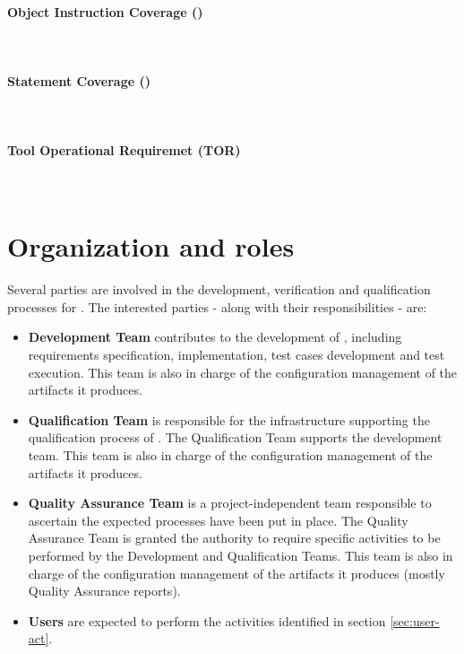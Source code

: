 \paragraph*{Object Instruction Coverage (\oic)} \ \\

\paragraph*{Statement Coverage (\stc)} \ \\

\paragraph*{Tool Operational Requiremet (TOR)} \ \\

\section{Organization and roles}
Several parties are involved in the development, verification and qualification processes for \xcov. The interested parties - along with their responsibilities - are:
\begin{itemize}
\item \textbf{\xcov Development Team} contributes to the development of \xcov, including requirements specification, implementation, test cases development and test execution. This team is also in charge of the configuration management of the artifacts it produces.
\item \textbf{\xcov Qualification Team} is responsible for the infrastructure
supporting the qualification process of \xcov. The Qualification Team supports the development team. This team is also in charge of the configuration management of the artifacts it produces.
\item \textbf{\xcov Quality Assurance Team} is a project-independent team responsible to ascertain the expected processes have been put in place. The Quality Assurance Team is granted the authority to require specific activities to be performed by the \xcov Development and Qualification Teams. This team is also in charge of the configuration management of the artifacts it produces (mostly Quality Assurance reports).
\item \textbf{\xcov Users} are expected to perform the activities identified in
section \ref{sec:user-act}.
\end{itemize}
